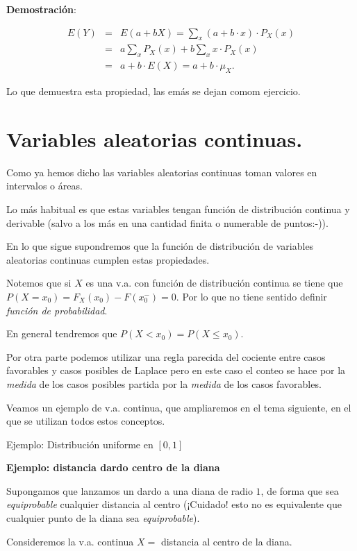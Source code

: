 \documentclass[
  letterpaper,
  DIV=11,
  numbers=noendperiod]{scrreprt}
\begin{document}
\textbf{Demostración}:

\begin{eqnarray*}
E(Y)&=& E(a+bX)=\sum_{x}(a+b\cdot x)\cdot P_{X}(x)\\
&=& a \sum_{x} P_{X}(x) + b \sum_{x} x\cdot P_{X}(x)\\ 
&=& a + b\cdot E(X)=a + b\cdot\mu_{X}.
\end{eqnarray*}

Lo que demuestra esta propiedad, las emás se dejan comom ejercicio.

\section{Variables aleatorias
continuas.}\label{variables-aleatorias-continuas.}

Como ya hemos dicho las variables aleatorias continuas toman valores en
intervalos o áreas.

Lo más habitual es que estas variables tengan función de distribución
continua y derivable (salvo a los más en una cantidad finita o numerable
de puntos:-)).

En lo que sigue supondremos que la función de distribución de variables
aleatorias continuas cumplen estas propiedades.

Notemos que si \(X\) es una v.a. con función de distribución continua se
tiene que \(P(X=x_0)=F_X(x_0)-F(x_0^{-})=0\). Por lo que no tiene
sentido definir \emph{función de probabilidad}.

En general tendremos que \(P(X<x_0)=P(X\leq x_0)\).

Por otra parte podemos utilizar una regla parecida del cociente entre
casos favorables y casos posibles de Laplace pero en este caso el conteo
se hace por la \emph{medida} de los casos posibles partida por la
\emph{medida} de los casos favorables.

Veamos un ejemplo de v.a. continua, que ampliaremos en el tema
siguiente, en el que se utilizan todos estos conceptos.

Ejemplo: Distribución uniforme en \([0,1]\)

\textbf{Ejemplo: distancia dardo centro de la diana}

Supongamos que lanzamos un dardo a una diana de radio \(1\), de forma
que sea \emph{equiprobable} cualquier distancia al centro (¡Cuidado!
esto no es equivalente que cualquier punto de la diana sea
\emph{equiprobable}).

Consideremos la v.a. continua \(X=\) distancia al centro de la diana.
\end{document}
